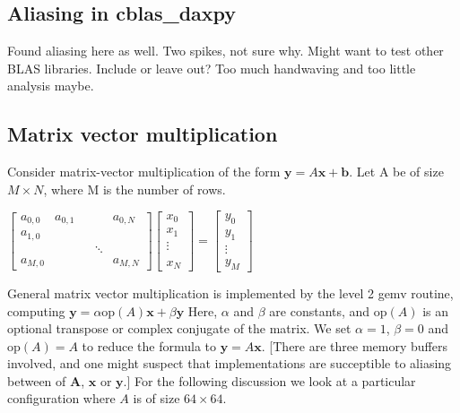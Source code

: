 \documentclass[a4paper,10pt,twocolumn,twoside]{article}
\begin{document}
\subsection{Aliasing in cblas\_daxpy}
Found aliasing here as well. Two spikes, not sure why. Might want to test other BLAS libraries. Include or leave out? Too much handwaving and too little analysis maybe.




\subsection{Matrix vector multiplication}

Consider matrix-vector multiplication of the form $\boldsymbol{y} = A\boldsymbol{x} + \boldsymbol{b}$.
Let A be of size $M \times N$, where M is the number of rows. 

$
\left[\begin{array}{ccccc}
a_{0,0} & a_{0,1} &  &  & a_{0,N}\\
a_{1,0}\\
 &  &  & \ddots\\
a_{M,0} &  &  &  & a_{M,N}
\end{array}\right]\left[\begin{array}{c}
x_{0}\\
x_{1}\\
\vdots\\
\\
x_{N}
\end{array}\right]=\left[\begin{array}{c}
y_{0}\\
y_{1}\\
\vdots\\
y_{M}
\end{array}\right]
$

General matrix vector multiplication is implemented by the level 2 gemv routine, computing $\boldsymbol{y} = \alpha\text{op}\left(A\right)\boldsymbol{x} + \beta\boldsymbol{y}$
Here, $\alpha$ and $\beta$ are constants, and $\text{op}\left(A\right)$ is an optional transpose or complex conjugate of the matrix. 
We set $\alpha = 1$, $\beta = 0$ and $\text{op} \left(A\right) = A$ to reduce the formula to $\boldsymbol{y}=A\boldsymbol{x}$.
[There are three memory buffers involved, and one might suspect that implementations are succeptible to aliasing between of $\boldsymbol{A}$, $\boldsymbol{x}$ or $\boldsymbol{y}$.]
For the following discussion we look at a particular configuration where $A$ is of size $64\times64$.
\end{document}
